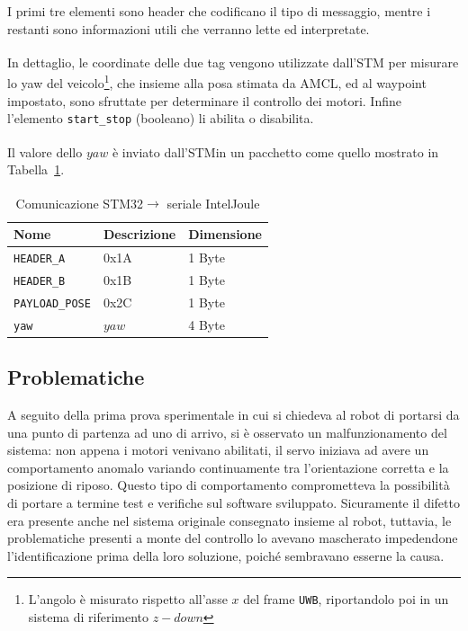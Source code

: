 I primi tre elementi sono header che codificano il tipo di messaggio, mentre i restanti sono informazioni utili che verranno lette ed interpretate. 

In dettaglio, le coordinate delle due tag vengono utilizzate dall'STM\textsuperscript\textregistered\hspace{1mm} per misurare lo yaw del veicolo\footnote{L'angolo è misurato rispetto all'asse $x$ del frame \texttt{UWB}, riportandolo poi in un sistema di riferimento $z-down$}, che insieme alla posa stimata da AMCL, ed al waypoint impostato, sono sfruttate per determinare il controllo dei motori. Infine l'elemento \verb!start_stop! (booleano) li abilita o disabilita.

Il valore dello $yaw$ è inviato dall'STM\textsuperscript\textregistered\hspace{1mm}in un pacchetto come quello mostrato in Tabella~\ref{table:comunicazione_stm2seriale}.

\bigskip
\bigskip

\begin{table}[h]
    \footnotesize
    \caption{Comunicazione STM32\textsuperscript\textregistered\hspace{1mm}$\rightarrow$ seriale Intel\textsuperscript\textregistered Joule\texttrademark}
\centering
\label{table:comunicazione_stm2seriale}
\begin{tabular}{lll}
\toprule
Nome                     & Descrizione   & Dimensione\\
\midrule
\verb!HEADER_A!          & 0x1A          & 1 Byte\\
\verb!HEADER_B!          & 0x1B          & 1 Byte\\
\verb!PAYLOAD_POSE!      & 0x2C          & 1 Byte\\
\hline
\verb!yaw!               & $yaw$         & 4 Byte\\
\bottomrule
    \end{tabular}
\end{table}

\subsection{Problematiche}
A seguito della prima prova sperimentale in cui si chiedeva al robot di portarsi da una punto di partenza ad uno di arrivo, si è osservato un malfunzionamento del sistema: non appena i motori venivano abilitati, il servo iniziava ad avere un comportamento anomalo variando continuamente tra l'orientazione corretta e la posizione di riposo. Questo tipo di comportamento comprometteva la possibilità di portare a termine test e verifiche sul software sviluppato. Sicuramente il difetto era presente anche nel sistema originale consegnato insieme al robot, tuttavia, le problematiche presenti a monte del controllo lo avevano mascherato impedendone l'identificazione prima della loro soluzione, poiché sembravano esserne la causa.


